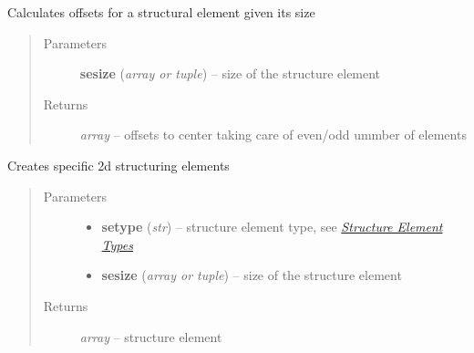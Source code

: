 \documentclass[letterpaper,10pt,english]{sphinxmanual}
\begin{document}
\begin{fulllineitems}
\label{api/ClearMap.ImageProcessing.Filter:ClearMap.ImageProcessing.Filter.StructureElement.structureElementOffsets}
Calculates offsets for a structural element given its size
\begin{quote}\begin{description}
\item[{Parameters}] \leavevmode
\textbf{sesize} (\emph{array or tuple}) --
size of the structure element

\item[{Returns}] \leavevmode
\emph{array} --
offsets to center taking care of even/odd ummber of elements

\end{description}\end{quote}

\end{fulllineitems}


\begin{fulllineitems}
\label{api/ClearMap.ImageProcessing.Filter:ClearMap.ImageProcessing.Filter.StructureElement.structureElement2D}
Creates specific 2d structuring elements
\begin{quote}\begin{description}
\item[{Parameters}] \leavevmode\begin{itemize}
\item {} 
\textbf{setype} (\emph{str}) --
structure element type, see {\hyperref[api/ClearMap.ImageProcessing.Filter:structureelementtypes]{\emph{Structure Element Types}}}

\item {} 
\textbf{sesize} (\emph{array or tuple}) --
size of the structure element

\end{itemize}

\item[{Returns}] \leavevmode
\emph{array} --
structure element

\end{description}\end{quote}

\end{fulllineitems}
\end{document}
